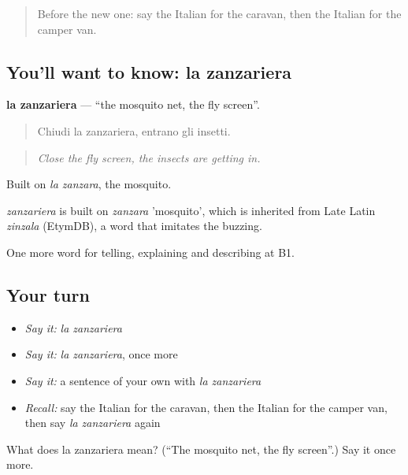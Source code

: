 \label{lesson:IT-C430-zanzariera}



\begin{quote}
Before the new one: say the Italian for the caravan, then the Italian for the camper van.
\end{quote}

\subsection*{You'll want to know: la zanzariera}
\textbf{la zanzariera} — \textquotedblleft{}the mosquito net, the fly screen\textquotedblright{}.

\begin{quote}
Chiudi la zanzariera, entrano gli insetti.
\end{quote}

\begin{quote}
\emph{Close the fly screen, the insects are getting in.}
\end{quote}

Built on \emph{la zanzara}, the mosquito.

\begin{cousinweb}
\emph{zanzariera} is built on \emph{zanzara} 'mosquito', which is inherited from Late Latin \emph{zinzala} (EtymDB), a word that imitates the buzzing.
\end{cousinweb}

\begin{grammarlens}[title={What you've built}]
One more word for telling, explaining and describing at B1.
\end{grammarlens}

\subsection*{Your turn}
\begin{itemize}
\raggedright
  \item \emph{Say it:} \emph{la zanzariera}
  \item \emph{Say it:} \emph{la zanzariera}, once more
  \item \emph{Say it:} a sentence of your own with \emph{la zanzariera}
  \item \emph{Recall:} say the Italian for the caravan, then the Italian for the camper van, then say \emph{la zanzariera} again
\end{itemize}

\begin{tcolorbox}[breakable,colback=teal!4,colframe=teal!35!black,title={Before you move on}]
What does la zanzariera mean? (\textquotedblleft{}The mosquito net, the fly screen\textquotedblright{}.) Say it once more.
\end{tcolorbox}
